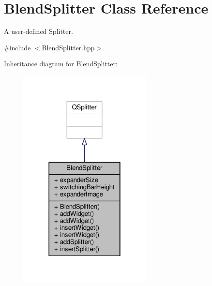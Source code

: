 \hypertarget{class_blend_splitter}{}\section{Blend\+Splitter Class Reference}
\label{class_blend_splitter}


A user-\/defined Splitter.  




{\ttfamily \#include $<$Blend\+Splitter.\+hpp$>$}



Inheritance diagram for Blend\+Splitter\+:
\nopagebreak
\begin{figure}[H]
\begin{center}
\leavevmode
\includegraphics[width=190pt]{class_blend_splitter__inherit__graph}
\end{center}
\end{figure}


